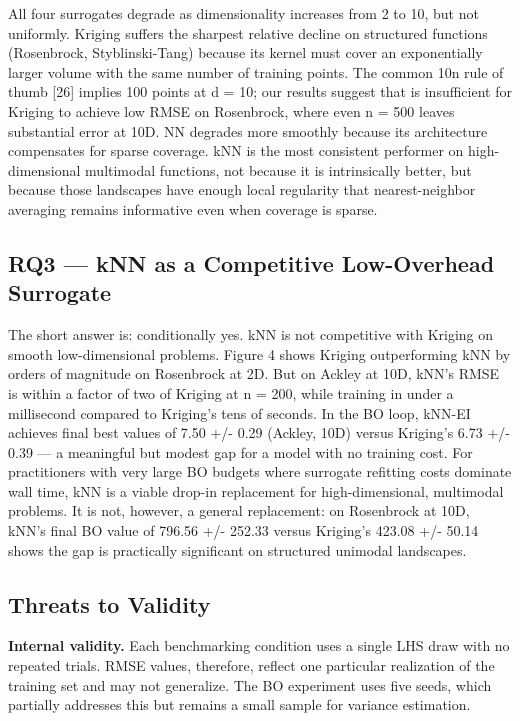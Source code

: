 \documentclass[sigconf,nonacm]{acmart}
\begin{document}
All four surrogates degrade as dimensionality increases from 2 to 10, but not uniformly. Kriging suffers the sharpest relative decline on structured functions (Rosenbrock, Styblinski-Tang) because its kernel must cover an exponentially larger volume with the same number of training points. The common 10n rule of thumb [26] implies 100 points at d = 10; our results suggest that is insufficient for Kriging to achieve low RMSE on Rosenbrock, where even n = 500 leaves substantial error at 10D. NN degrades more smoothly because its architecture compensates for sparse coverage. kNN is the most consistent performer on high-dimensional multimodal functions, not because it is intrinsically better, but because those landscapes have enough local regularity that nearest-neighbor averaging remains informative even when coverage is sparse.

\subsection{RQ3 — kNN as a Competitive Low-Overhead Surrogate}

The short answer is: conditionally yes. kNN is not competitive with Kriging on smooth low-dimensional problems. Figure 4 shows Kriging outperforming kNN by orders of magnitude on Rosenbrock at 2D. But on Ackley at 10D, kNN's RMSE is within a factor of two of Kriging at n = 200, while training in under a millisecond compared to Kriging's tens of seconds. In the BO loop, kNN-EI achieves final best values of 7.50 +/- 0.29 (Ackley, 10D) versus Kriging's 6.73 +/- 0.39 — a meaningful but modest gap for a model with no training cost. For practitioners with very large BO budgets where surrogate refitting costs dominate wall time, kNN is a viable drop-in replacement for high-dimensional, multimodal problems. It is not, however, a general replacement: on Rosenbrock at 10D, kNN's final BO value of 796.56 +/- 252.33 versus Kriging's 423.08 +/- 50.14 shows the gap is practically significant on structured unimodal landscapes.

\subsection{Threats to Validity}

\textbf{Internal validity.}  Each benchmarking condition uses a single LHS draw with no repeated trials. RMSE values, therefore, reflect one particular realization of the training set and may not generalize. The BO experiment uses five seeds, which partially addresses this but remains a small sample for variance estimation.
\end{document}
